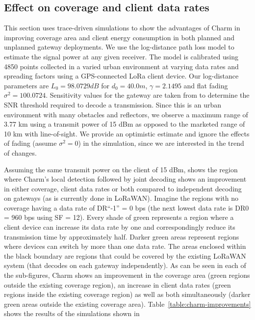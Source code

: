 \subsection{Effect on coverage and client data rates}
\label{sec:coverage-data-rate-improvement}

This section uses trace-driven simulations to show the advantages of Charm in improving coverage area and client energy consumption in both planned and unplanned gateway deployments. We use the log-distance path loss model to estimate the signal power at any given receiver. The model is calibrated using 4850 points collected in a varied urban environment at varying data rates and spreading factors using a GPS-connected LoRa client device. Our log-distance parameters are $L_0  = 98.0729 dB$ for $d_0 = 40.0 m$, $\gamma = 2.1495$ and flat fading $\sigma^2 = 100.0724$. Sensitivity values for the gateway are taken from \cite{Bor2016} to determine the SNR threshold required to decode a transmission. Since this is an urban environment with many obstacles and reflectors, we observe a maximum range of 3.77 km using a transmit power of 15 dBm as opposed to the marketed range of 10 km with line-of-sight. We provide an optimistic estimate and ignore the effects of fading (assume $\sigma^2 = 0$) in the simulation, since we are interested in the trend of changes.

Assuming the same transmit power on the client of 15 dBm,  shows the region where Charm's local detection followed by joint decoding shows an improvement in either coverage, client data rates or both compared to independent decoding on gateways (as is currently done in LoRaWAN). Imagine the regions with no coverage having a data rate of DR``-1'' = 0 bps (the next lowest data rate is DR0 = 960 bps using SF = 12). Every shade of green represents a region where a client device can increase its data rate by one and correspondingly reduce its transmission time by approximately half. Darker green areas represent regions where devices can switch by more than one data rate. The areas enclosed within the black boundary are regions that could be covered by the existing LoRaWAN system (that decodes on each gateway independently). As can be seen in each of the sub-figures, Charm shows an improvement in the coverage area (green regions outside the existing coverage region), an increase in client data rates (green regions inside the existing coverage region) as well as both simultaneously (darker green areas outside the existing coverage area). Table~\ref{table:charm-improvements} shows the results of the simulations shown in 

